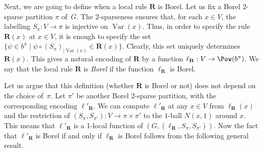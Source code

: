 \documentclass[12pt,a4paper]{article}
\numberwithin{equation}{section}
\theoremstyle{definition}
\newcommand\Var{\operatorname{Var}}
\begin{document}
    
    Next, we are going to define when a local rule  $\mathbf R$ is Borel. 
    Let us fix a Borel $2$-sparse partition $\pi$ of~$G$. The $2$-sparseness ensures that, for each $x\in V$, the labelling $S_\pi:V\to \pi$ is injective on $\Var(x)$. 
    Thus, in order to specify the rule $\mathbf R(x)$ at $x\in V$, it is enough to specify the set $\{\psi\in b^{\pi}\mid  \psi\circ (S_\pi)_{|\Var(x)}\in\mathbf R(x)\}$. Clearly, this set uniquely determines $\mathbf R(x)$.  This gives a natural encoding of $\mathbf R$ by a function $\ell_{\mathbf R}:V\to \Pow(b^\pi)$. We say that the local rule $\mathbf R$  is \emph{Borel} if the function $\ell_{\mathbf R}$ is Borel. 
    
    Let us argue that this definition (whether $\mathbf R$ is Borel or not) does not depend on the choice of~$\pi$.
    Let $\pi'$ be another Borel $2$-sparse partition, with the corresponding encoding $\ell'_{\mathbf R}$. We can compute $\ell'_{\mathbf R}$ at any $x\in V$ from $\ell_{\mathbf R}(x)$  and the restriction of $(S_\pi,S_{\pi'}):V\to \pi\times \pi'$ to the $1$-ball $N(x,1)$ around $x$. This means that $\ell'_{\mathbf R}$ is a 1-local function of $(G,(\ell_{\mathbf R},S_\pi,S_{\pi'}))$. Now the fact that $\ell'_{\mathbf R}$ is Borel if and only if $\ell_{\mathbf R}$ is Borel follows from the following general result.
    
\end{document}
